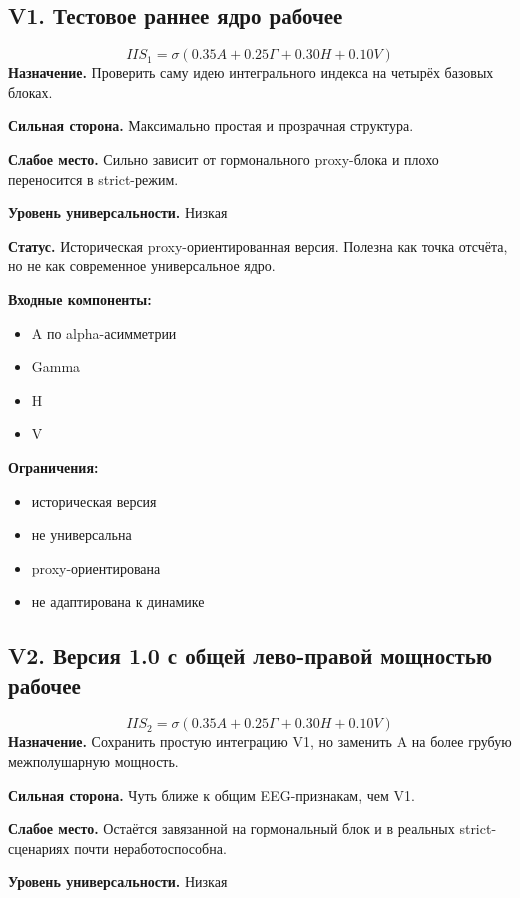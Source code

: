 \documentclass[11pt,a4paper]{article}
\begin{document}
\subsection*{V1. Тестовое раннее ядро \textcolor{green!20!black}{\textbf{рабочее}}}
\[
IIS_1=\sigma(0.35A+0.25\Gamma+0.30H+0.10V)
\]
\textbf{Назначение.} Проверить саму идею интегрального индекса на четырёх базовых блоках.

\textbf{Сильная сторона.} Максимально простая и прозрачная структура.

\textbf{Слабое место.} Сильно зависит от гормонального proxy-блока и плохо переносится в strict-режим.

\textbf{Уровень универсальности.} Низкая

\textbf{Статус.} Историческая proxy-ориентированная версия. Полезна как точка отсчёта, но не как современное универсальное ядро.

\textbf{Входные компоненты:}
\begin{itemize}[leftmargin=1.2cm]
\item A по alpha-асимметрии
\item Gamma
\item H
\item V
\end{itemize}

\textbf{Ограничения:}
\begin{itemize}[leftmargin=1.2cm]
\item историческая версия
\item не универсальна
\item proxy-ориентирована
\item не адаптирована к динамике
\end{itemize}


\subsection*{V2. Версия 1.0 с общей лево-правой мощностью \textcolor{green!20!black}{\textbf{рабочее}}}
\[
IIS_2=\sigma(0.35A+0.25\Gamma+0.30H+0.10V)
\]
\textbf{Назначение.} Сохранить простую интеграцию V1, но заменить A на более грубую межполушарную мощность.

\textbf{Сильная сторона.} Чуть ближе к общим EEG-признакам, чем V1.

\textbf{Слабое место.} Остаётся завязанной на гормональный блок и в реальных strict-сценариях почти неработоспособна.

\textbf{Уровень универсальности.} Низкая
\end{document}
